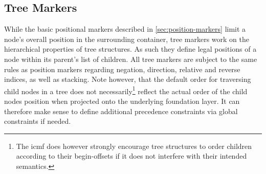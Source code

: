 \documentclass[11pt,a4paper]{article}
\begin{document}
\subsection{Tree Markers}
\label{sec:tree-markers}

While the basic positional markers described in \cref{sec:position-markers} limit a node's overall position in the surrounding container, tree markers work on the hierarchical properties of tree structures.
As such they define legal positions of a node within its parent's list of children.
All tree markers are subject to the same rules as position markers regarding negation, direction, relative and reverse indices, as well as stacking.
Note however, that the default order for traversing child nodes in a tree does not necessarily\footnote{The \ac{icmf} does however strongly encourage tree structures to order children according to their begin-offsets if it does not interfere with their intended semantics.} reflect the actual order of the child nodes position when projected onto the underlying foundation layer.
It can therefore make sense to define additional precedence constraints via global constraints if needed.
\end{document}
